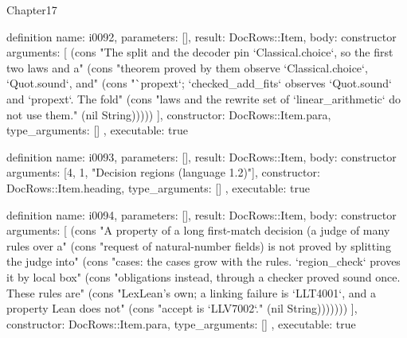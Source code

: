 \begin{lexlean}{Chapter17}
\begin{semanticmodule}
definition{
  name: i0092,
  parameters: [],
  result: DocRows::Item,
  body: constructor{
    arguments: [
      (cons "The split and the decoder pin `Classical.choice`, so the first two laws and a" (cons "theorem proved by them observe `Classical.choice`, `Quot.sound`, and" (cons "`propext`; `checked_add_fits` observes `Quot.sound` and `propext`. The fold" (cons "laws and the rewrite set of `linear_arithmetic` do not use them." (nil String)))))
    ],
    constructor: DocRows::Item.para,
    type_arguments: []
  },
  executable: true
}

definition{
  name: i0093,
  parameters: [],
  result: DocRows::Item,
  body: constructor{
    arguments: [4, 1, "Decision regions (language 1.2)"],
    constructor: DocRows::Item.heading,
    type_arguments: []
  },
  executable: true
}

definition{
  name: i0094,
  parameters: [],
  result: DocRows::Item,
  body: constructor{
    arguments: [
      (cons "A property of a long first-match decision (a judge of many rules over a" (cons "request of natural-number fields) is not proved by splitting the judge into" (cons "cases: the cases grow with the rules. `region_check` proves it by local box" (cons "obligations instead, through a checker proved sound once. These rules are" (cons "LexLean's own; a linking failure is `LLT4001`, and a property Lean does not" (cons "accept is `LLV7002`." (nil String)))))))
    ],
    constructor: DocRows::Item.para,
    type_arguments: []
  },
  executable: true
}


\end{semanticmodule}
\end{lexlean}
